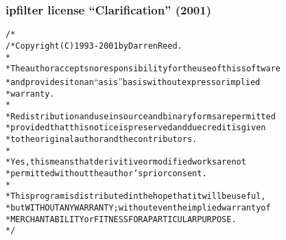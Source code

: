 
\begin{frame}
\frametitle{ipfilter license ``Clarification'' (2001)}

\begin{alltt}
\footnotesize
/* \\
/* Copyright (C) 1993-2001 by Darren Reed. \\
 * \\
 * The author accepts no responsibility for the use of this software \\
 * and provides it on an ``as is'' basis without express or implied \\
 *  warranty. \\
 * \\
 * Redistribution and use in source and binary forms are permitted \\
 * provided that this notice is preserved and due credit is given \\
 * to the original author and the contributors. \\
 * \\
 * \alert{Yes, this means that derivitive or modified works are not} \\ 
 * \alert{permitted without the author's prior consent.} \\
 * \\
 * This program is distributed in the hope that it will be useful, \\
 * but WITHOUT ANY WARRANTY; without even the implied warranty of \\
 * MERCHANTABILITY or FITNESS FOR A PARTICULAR PURPOSE. \\
 * /

\end{alltt}

\end{frame}



